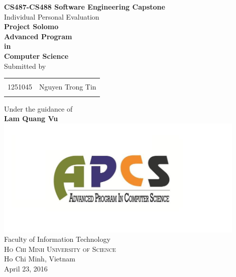 \begin{titlepage}

\begin{center}

\textup{\small {\bf CS487-CS488 Software Engineering Capstone} \\ Individual Personal Evaluation}\\[0.2in]

\Large \textbf {Project Solomo}\\[0.5in]

       {\bf Advanced Program \\in\\ Computer Science}\\[0.5in]

\normalsize Submitted by \\
\begin{table}[h]
\centering
\begin{tabular}{lr}\hline \\
1251045 & Nguyen Trong Tin \\
\\ \hline 
\end{tabular}
\end{table}

\vspace{.1in}
Under the guidance of\\
{\textbf{Lam Quang Vu}}\\[0.2in]
\vfill
\includegraphics[width=0.9\textwidth]{./apcs}\\[0.1in]
\Large{Faculty of Information Technology}\\
\normalsize
\textsc{Ho Chi Minh University of Science}\\
Ho Chi Minh, Vietnam \\
\vspace{0.2cm}
April 23, 2016

\end{center}

\end{titlepage}
